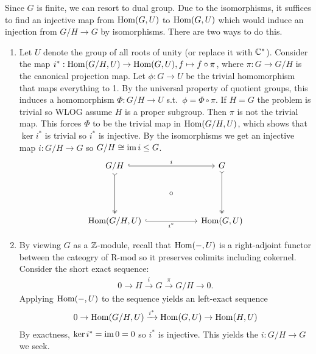 \documentclass[12pt]{article}
\begin{document}
\begin{problem}[4]
Since $ G$ is finite, we can resort to dual group. Due to the isomorphisms, it suffices to find an injective map from $ \operatorname{Hom}( G, U)$ to $ \operatorname{Hom}( G, U)$ which would induce an injection from $ G /H \to G$ by isomorphisms. There are two ways to do this.
\begin{enumerate}[label=(\arabic*)]
	\item Let $ U$ denote the group of all roots of unity (or replace it with $ \mathbb{C}^* $). Consider the map $ i^* : \operatorname{Hom}( G /H, U) \to \operatorname{Hom}( G, U), f \mapsto f \circ \pi$, where $ \pi: G \to G /H$ is the canonical projection map. Let $ \phi: G \to U$ be the trivial homomorphism that maps everything to 1. By the universal property of quotient groups, this induces a homomorphism $ \Phi: G /H \to U$ s.t.\ $ \phi = \Phi \circ \pi$. If $ H= G$ the problem is trivial so WLOG assume $ H$ is a proper subgroup. Then  $ \pi$  is not the trivial map. This forces $ \Phi$ to be the trivial map in $ \operatorname{Hom}( G /H, U)$, which shows that $ \ker i^* $ is trivial so $ i^*$ is injective. By the isomorphisms we get an injective map $ i: G /H \to G$ so $G /H \cong \operatorname{im} i \leq G$.
\[\begin{tikzcd}
	{G/H} && G \\
	& \circ \\
	{\text{Hom}(G/H,U)} && {\text{Hom}(G,U)}
	\arrow["i", hook, from=1-1, to=1-3]
	\arrow[tail, two heads, from=1-1, to=3-1]
	\arrow["{i^*}"', hook, from=3-1, to=3-3]
	\arrow[tail, two heads, from=1-3, to=3-3]
\end{tikzcd}\]
	\item By viewing $ G$ as a  $ \mathbb{Z}$-module, recall that $ \operatorname{Hom}( -, U)$ is a right-adjoint functor between the cateogry of  \textsf{R-mod} so it preserves colimits including cokernel. Consider the short exact sequence:
\begin{align*}
	0 \to H \xrightarrow{i} G \xrightarrow{ \pi} G /H \to 0 .
\end{align*}
Applying $ \operatorname{Hom}( -, U)$ to the sequence yields an left-exact sequence
		\begin{align*}
			0 \to \operatorname{Hom}( G /H, U) \xrightarrow{i^* } \operatorname{Hom}( G, U) \to \operatorname{Hom}( H,U )
		\end{align*}
		By exactness, $ \ker i^*  = \operatorname{im} 0 = 0$ so $ i^* $ is injective. This yields the $ i: G /H \to G$ we seek. 
\end{enumerate}


\end{problem}
\end{document}
